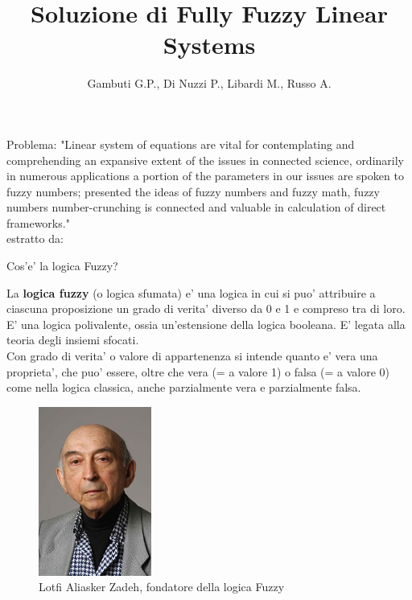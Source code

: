 \documentclass[9pt,aspectratio=169]{beamer}
\date[]{}
\title[]{Soluzione di Fully Fuzzy Linear Systems}
\author[]{Gambuti G.P., Di Nuzzi P., Libardi M., Russo A.}
\begin{document}
\maketitle
\begin{frame}{Problema:}
    "Linear system of equations are vital for contemplating and comprehending an expansive extent of the issues in connected science, ordinarily in numerous applications a portion of the parameters in our issues are spoken to fuzzy numbers; presented the ideas of fuzzy numbers and fuzzy math, fuzzy numbers number-crunching is connected and valuable in calculation of direct frameworks." \\
    
    \hfill\break
    estratto da: \cite{eliminazione}

\end{frame}
\begin{frame}{Cos'e' la logica Fuzzy?}
\begin{multicols}{2}
La \textbf{logica fuzzy} (o logica sfumata) e' una logica in cui si puo' attribuire a ciascuna proposizione un grado di verita' diverso da 0 e 1 e compreso tra di loro. E' una logica polivalente, ossia un'estensione della logica booleana. E' legata alla teoria degli insiemi sfocati. \\Con grado di verita' o valore di appartenenza si intende quanto e' vera una proprieta', che puo' essere, oltre che vera (= a valore 1) o falsa (= a valore 0) come nella logica classica, anche parzialmente vera e parzialmente falsa.

\begin{figure}[h]
\includegraphics[width=0.33\textwidth]{images/Lotfi_Zadeh_Berkeley_c.jpg}
\caption{Lotfi Aliasker Zadeh, fondatore della logica Fuzzy}
\end{figure}
    
\end{multicols}

\end{frame}
\end{document}
